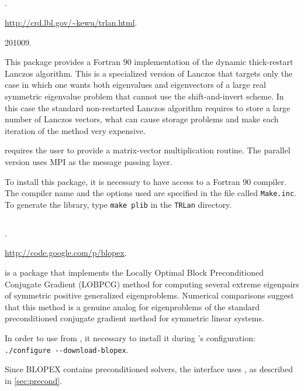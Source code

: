 \subsection*{\underline{\trlan}}
	\begin{description}
	\setlength{\itemsep}{0pt}
	\item[References.]\citep{Wu:2000:TLM}.
	\item[Website.] \url{http://crd.lbl.gov/\~kewu/trlan.html}.
	\item[Version.] 201009.
	\item[Summary.] This package provides a Fortran 90 implementation of the dynamic thick-restart Lanczos algorithm. This is a specialized version of Lanczos that targets only the case in which one wants both eigenvalues and eigenvectors of a large real symmetric eigenvalue problem that cannot use the shift-and-invert scheme. In this case the standard non-restarted Lanczos algorithm requires to store a large number of Lanczos vectors, what can cause storage problems and make each iteration of the method very expensive.

	\trlan{} requires the user to provide a matrix-vector multiplication routine. The parallel version uses MPI as the message passing layer. 
	\item[Installation.] To install this package, it is necessary to have access to a Fortran 90 compiler. The compiler name and the options used are specified in the file called \texttt{Make.inc}. To generate the library, type \texttt{make plib} in the \texttt{TRLan} directory.
	\end{description}

\subsection*{\underline{\blopex}}
	\begin{description}
	\setlength{\itemsep}{0pt}
	\item[References.]\citep{Knyazev:2007:BLO}.
	\item[Website.] \url{http://code.google.com/p/blopex}.
	\item[Summary.] \blopex is a package that implements the Locally Optimal Block Preconditioned Conjugate Gradient (LOBPCG) method for computing several extreme eigenpairs of symmetric positive generalized eigenproblems. Numerical comparisons suggest that this method is a genuine analog for eigenproblems of the standard preconditioned conjugate gradient method for symmetric linear systems.
	\item[Installation.] In order to use \blopex from \slepc, it necessary to install it during \slepc's configuration: \Verb!./configure --download-blopex!.
	\item[Specific options.] Since BLOPEX contains preconditioned solvers, the \slepc interface uses , as described in \ref{sec:precond}.
	\end{description}

